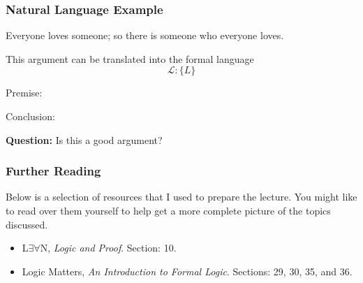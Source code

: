 \documentclass{beamer}
\theoremstyle{indentDefn} \newtheorem{defn}[]{Definition}
\begin{document}
\begin{frame}
	\frametitle{Natural Language Example}
	
	Everyone loves someone; so there is someone who everyone loves.
	
	\vspace{0.5cm}
	
	This argument can be translated into the formal language $$\mathcal{L}:\{L\}$$
	
	\vspace{0.3cm}
	
	Premise:
	
	\vspace{0.5cm}
	
	Conclusion: 
	
	\vspace{0.5cm}
	
	{\bf Question:} Is this a good argument? 
	
\end{frame}


\begin{frame}
  \frametitle{Further Reading}


Below is a selection of resources that I used to prepare the lecture. You might like to read over them yourself to help get a more complete picture of the topics discussed. 

\vspace{0.5cm}

\begin{itemize}
	\item L$\exists \forall$N, \emph{Logic and Proof}. Section: 10.
	\item Logic Matters, \emph{An Introduction to Formal Logic}. Sections: 29, 30, 35, and 36.
\end{itemize}

\end{frame}
\end{document}
